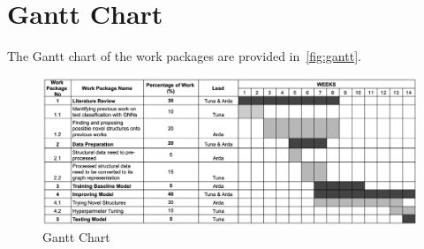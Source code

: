 \documentclass[a4paper, 12pt]{article}
\begin{document}
\section{Gantt Chart}
The Gantt chart of the work packages are provided in~\autoref{fig:gantt}.
\begin{figure}[H]
    \centering
    \includegraphics[width=\linewidth]{gann.png}
    \caption{Gantt Chart}
    \label{fig:gantt}
\end{figure}

\printbibliography{}
\end{document}
